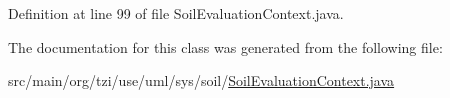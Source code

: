 Definition at line 99 of file Soil\-Evaluation\-Context.\-java.



The documentation for this class was generated from the following file\-:\begin{DoxyCompactItemize}
\item 
src/main/org/tzi/use/uml/sys/soil/\hyperlink{_soil_evaluation_context_8java}{Soil\-Evaluation\-Context.\-java}\end{DoxyCompactItemize}
